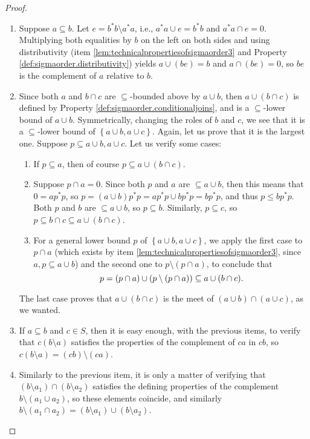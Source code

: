 \begin{proof}
\begin{enumerate}[label=(\alph*)]
        \item Suppose $a\subseteq b$. Let $e=b^*b\setminus a^*a$, i.e., $a^*a\cup e=b^*b$ and $a^*a\cap e=0$. Multiplying both equalities by $b$ on the left on both sides and using distributivity (item \ref{lem:technicalpropertiesofsigmaorder3} and Property \ref{def:sigmaorder.distributivity}) yields $a\cup(be)=b$ and $a\cap(be)=0$, so $be$ is the complement of $a$ relative to $b$.
        
        \item Since both $a$ and $b\cap c$ are $\subseteq$-bounded above by $a\cup b$, then $a\cup(b\cap c)$ is defined by Property \ref{def:sigmaorder.conditionaljoins}, and is a $\subseteq$-lower bound of $a\cup b$. Symmetrically, changing the roles of $b$ and $c$, we see that it is a $\subseteq$-lower bound of $\left\{a\cup b,a\cup c\right\}$. Again, let us prove that it is the largest one. Suppose $p\subseteq a\cup b,a\cup c$. Let us verify some cases:
        \begin{enumerate}[label=(\arabic*)]
            \item If $p\subseteq a$, then of course $p\subseteq a\cup(b\cap c)$.
            \item Suppose $p\cap a=0$. Since both $p$ and $a$ are $\subseteq a\cup b$, then this means that $0=ap^*p$, so $p=(a\cup b)p^*p=ap^*p\cup bp^*p=bp^*p$, and thus $p\leq bp^*p$. Both $p$ and $b$ are $\subseteq a\cup b$, so $p\subseteq b$. Similarly, $p\subseteq c$, so $p\subseteq b\cap c\subseteq a\cup(b\cap c)$.
            \item For a general lower bound $p$ of $\left\{a\cup b,a\cup c\right\}$, we apply the first case to $p\cap a$ (which exists by item \ref{lem:technicalpropertiesofsigmaorder3}, since $a,p\subseteq a\cup b$) and the second one to $p\setminus(p\cap a)$, to conclude that
            \[p=(p\cap a)\cup(p\setminus(p\cap a))\subseteq a\cup(b\cap c).\qedhere\]
        \end{enumerate}
        The last case proves that $a\cup(b\cap c)$ is the meet of $(a\cup b)\cap(a\cup c)$, as we wanted.
        \item If $a\subseteq b$ and $c\in S$, then it is easy enough, with the previous items, to verify that $c(b\setminus a)$ satisfies the properties of the complement of $ca$ in $cb$, so $c(b\setminus a)=(cb)\setminus(ca)$.
        \item Similarly to the previous item, it is only a matter of verifying that $(b\setminus a_1)\cap(b\setminus a_2)$ satisfies the defining properties of the complement $b\setminus (a_1\cup a_2)$, so these elements coincide, and similarly $b\setminus (a_1\cap a_2)=(b\setminus a_1)\cup(b\setminus a_2)$.\qedhere
    \end{enumerate}
\end{proof}

